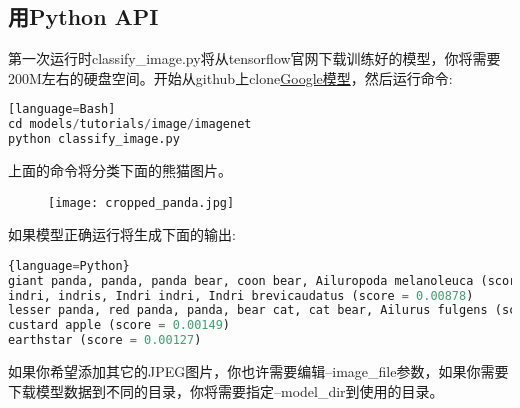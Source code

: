 \subsection{用Python API}
第一次运行时classify\_image.py将从tensorflow官网下载训练好的模型，你将需要200M左右的硬盘空间。开始从github上clone\href{https://github.com/tensorflow/models}{Google模型}，然后运行命令:
\begin{lstlisting}[language=Python][language=Bash]
cd models/tutorials/image/imagenet
python classify_image.py
\end{lstlisting}
上面的命令将分类下面的熊猫图片。
\begin{center}
\begin{figure}[h]
\texttt{[image: cropped\_panda.jpg]}
\end{figure}
\end{center}
如果模型正确运行将生成下面的输出:
\begin{lstlisting}[language=Python]{language=Python}
giant panda, panda, panda bear, coon bear, Ailuropoda melanoleuca (score = 0.88493)
indri, indris, Indri indri, Indri brevicaudatus (score = 0.00878)
lesser panda, red panda, panda, bear cat, cat bear, Ailurus fulgens (score = 0.00317)
custard apple (score = 0.00149)
earthstar (score = 0.00127)
\end{lstlisting}
如果你希望添加其它的JPEG图片，你也许需要编辑--image\_file参数，如果你需要下载模型数据到不同的目录，你将需要指定--model\_dir到使用的目录。
